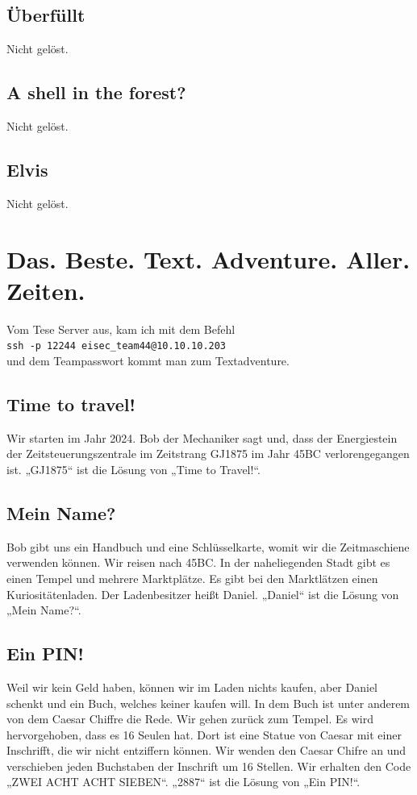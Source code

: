 \documentclass[12pt, a4paper, titlepage, oneside]{scrartcl}
\begin{document}
	\subsection{\"Uberf\"ullt}
	Nicht gelöst.

	\subsection{A shell in the forest?}
	Nicht gelöst.

	\subsection{Elvis}
	Nicht gelöst.

	\section{Das. Beste. Text. Adventure. Aller. Zeiten.}
	Vom Tese Server aus, kam ich mit dem Befehl \\
	\lstinline{ssh -p 12244 eisec_team44@10.10.10.203} \\
	und dem Teampasswort kommt man zum Textadventure.

	\subsection{Time to travel!}
	Wir starten im Jahr 2024. Bob der Mechaniker sagt und, dass der Energiestein der
	Zeitsteuerungszentrale im Zeitstrang GJ1875 im Jahr 45BC verlorengegangen ist. „GJ1875“ ist die
	Lösung von „Time to Travel!“.

	\subsection{Mein Name?}
	Bob gibt uns ein Handbuch und eine Schlüsselkarte, womit wir die Zeitmaschiene verwenden
	können. Wir reisen nach 45BC. In der naheliegenden Stadt gibt es einen Tempel und mehrere
	Marktplätze. Es gibt bei den Marktlätzen einen Kuriositätenladen. Der Ladenbesitzer heißt Daniel.
	„Daniel“ ist die Lösung von „Mein Name?“.

	\subsection{Ein PIN!}
	Weil wir kein Geld haben, können wir im Laden nichts kaufen, aber Daniel schenkt und ein Buch,
	welches keiner kaufen will. In dem Buch ist unter anderem von dem Caesar Chiffre die Rede. Wir
	gehen zurück zum Tempel. Es wird hervorgehoben, dass es 16 Seulen hat. Dort ist eine Statue von
	Caesar mit einer Inschrifft, die wir nicht entziffern können. Wir wenden den Caesar Chifre an und
	verschieben jeden Buchstaben der Inschrift um 16 Stellen. Wir erhalten den Code „ZWEI ACHT
	ACHT SIEBEN“. „2887“ ist die Lösung von „Ein PIN!“.
\end{document}
